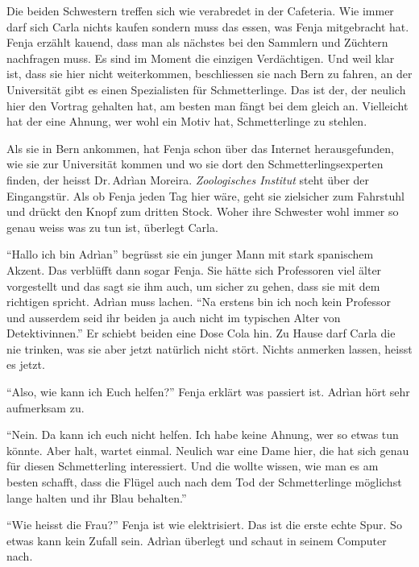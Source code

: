 Die beiden Schwestern treffen sich wie verabredet in der Cafeteria. Wie immer darf sich Carla nichts kaufen sondern muss das essen, was Fenja mitgebracht hat. Fenja erzählt kauend, dass man als nächstes bei den Sammlern und Züchtern nachfragen muss. Es sind im Moment die einzigen Verdächtigen. Und weil klar ist, dass sie hier nicht weiterkommen, beschliessen sie nach Bern zu fahren, an der Universität gibt es einen Spezialisten für Schmetterlinge. Das ist der, der neulich hier den Vortrag gehalten hat, am besten man fängt bei dem gleich an. Vielleicht hat der eine Ahnung, wer wohl ein Motiv hat, Schmetterlinge zu stehlen.
\begin{center}
\end{center}
Als sie in Bern ankommen, hat Fenja schon über das Internet herausgefunden, wie sie zur Universität kommen und wo sie dort den Schmetterlingsexperten finden, der heisst Dr.\,Adrìan Moreira. \emph{Zoologisches Institut} steht über der Eingangstür. Als ob Fenja jeden Tag hier wäre, geht sie zielsicher zum Fahrstuhl und drückt den Knopf zum dritten Stock. Woher ihre Schwester wohl immer so genau weiss was zu tun ist, überlegt Carla.

\enquote{Hallo ich bin Adrìan} begrüsst sie ein junger Mann mit stark spanischem Akzent. Das verblüfft dann sogar Fenja. Sie hätte sich Professoren viel älter vorgestellt und das sagt sie ihm auch, um sicher zu gehen, dass sie mit dem richtigen spricht. Adrìan muss lachen. \enquote{Na erstens bin ich noch kein Professor und ausserdem seid ihr beiden ja auch nicht im typischen Alter von Detektivinnen.} Er schiebt beiden eine Dose Cola hin. Zu Hause darf Carla die nie trinken, was sie aber jetzt natürlich nicht stört. Nichts anmerken lassen, heisst es jetzt.

\enquote{Also, wie kann ich Euch helfen?} Fenja erklärt was passiert ist. Adrìan hört sehr aufmerksam zu.

\enquote{Nein. Da kann ich euch nicht helfen. Ich habe keine Ahnung, wer so etwas tun könnte. Aber halt, wartet einmal. Neulich war eine Dame hier, die hat sich genau für diesen Schmetterling interessiert. Und die wollte wissen, wie man es am besten schafft, dass die Flügel auch nach dem Tod der Schmetterlinge möglichst lange halten und ihr Blau behalten.}

\enquote{Wie heisst die Frau?} Fenja ist wie elektrisiert. Das ist die erste echte Spur. So etwas kann kein Zufall sein. Adrìan überlegt und schaut in seinem Computer nach.

